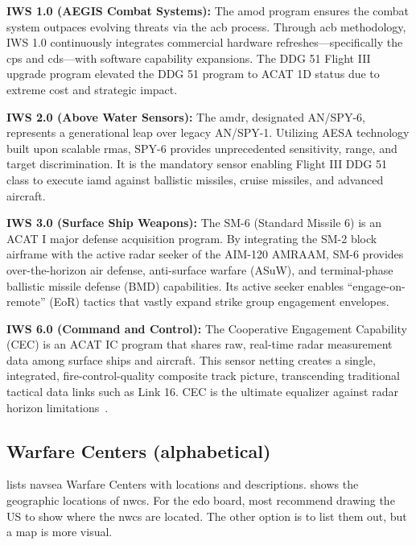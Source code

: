 \documentclass[../main.tex]{subfiles}
\begin{document}
\textbf{IWS 1.0 (AEGIS Combat Systems):} The \ac{amod} program ensures the combat system outpaces evolving threats via the \ac{acb} process. Through \ac{acb} methodology, IWS 1.0 continuously integrates commercial hardware refreshes---specifically the \ac{cps} and \ac{cds}---with software capability expansions. The DDG 51 Flight III upgrade program elevated the DDG 51 program to ACAT 1D status due to extreme cost and strategic impact.

\textbf{IWS 2.0 (Above Water Sensors):} The \ac{amdr}, designated AN/SPY-6, represents a generational leap over legacy AN/SPY-1. Utilizing AESA technology built upon scalable \acp{rma}, SPY-6 provides unprecedented sensitivity, range, and target discrimination. It is the mandatory sensor enabling Flight III DDG 51 class to execute \ac{iamd} against ballistic missiles, cruise missiles, and advanced aircraft.

\textbf{IWS 3.0 (Surface Ship Weapons):} The SM-6 (Standard Missile 6) is an ACAT I major defense acquisition program. By integrating the SM-2 block airframe with the active radar seeker of the AIM-120 AMRAAM, SM-6 provides over-the-horizon air defense, anti-surface warfare (ASuW), and terminal-phase ballistic missile defense (BMD) capabilities. Its active seeker enables ``engage-on-remote'' (EoR) tactics that vastly expand strike group engagement envelopes.

\textbf{IWS 6.0 (Command and Control):} The Cooperative Engagement Capability (CEC) is an ACAT IC program that shares raw, real-time radar measurement data among surface ships and aircraft. This sensor netting creates a single, integrated, fire-control-quality composite track picture, transcending traditional tactical data links such as Link 16. CEC is the ultimate equalizer against radar horizon limitations~\autocite{navsea-cec-enhancing-battlefield-awareness-2025}.

\subsection{Warfare Centers (alphabetical)}

\Tab{\ref{tab:navsea-centers}} lists \ac{navsea} Warfare Centers with locations and descriptions. \Fig{\ref{fig:nwc-locations}} shows the geographic locations of \acp{nwc}. For the \ac{edo} board, most recommend drawing the US to show where the \acp{nwc} are located. The other option is to list them out, but a map is more visual.
\end{document}
